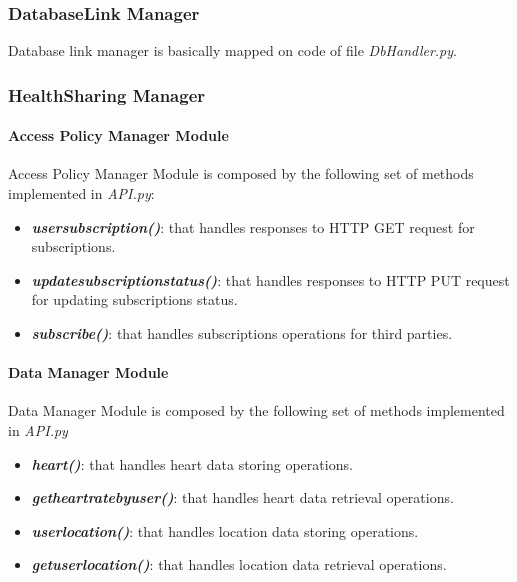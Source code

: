 \documentclass{article}
\begin{document}
\subsubsection{DatabaseLink Manager}
Database link manager is basically mapped on code of file \textit{DbHandler.py}.
\subsubsection{HealthSharing Manager}
\paragraph{Access Policy Manager Module}
Access Policy Manager Module is composed by the following set of methods implemented in \textit{API.py}:
\begin{itemize}
	\item \textit{\textbf{user\textunderscore subscription()}}: that handles responses to HTTP GET request for subscriptions.
	\item \textit{\textbf{update\textunderscore subscription\textunderscore status()}}: that handles responses to HTTP PUT request for updating subscriptions status.
	\item \textit{\textbf{subscribe()}}: that handles subscriptions operations for third parties.
\end{itemize}

\paragraph{Data Manager Module}
Data Manager Module is composed by the following set of methods implemented in \textit{API.py}
\begin{itemize}
	\item \textit{\textbf{heart()}}: that handles heart data storing operations.
	\item \textit{\textbf{get\textunderscore heart\textunderscore rate\textunderscore by\textunderscore user()}}: that handles heart data retrieval operations.
	\item \textit{\textbf{user\textunderscore location()}}: that handles location data storing operations.
	\item \textit{\textbf{get\textunderscore user\textunderscore location()}}: that handles location data retrieval operations.
\end{itemize}
\end{document}
